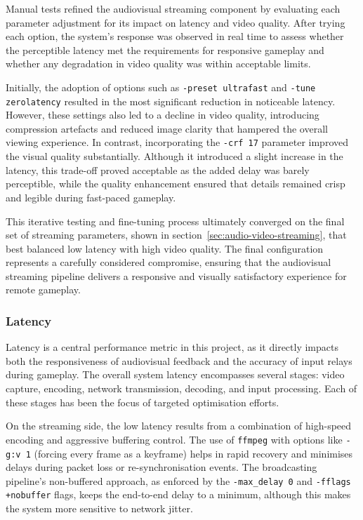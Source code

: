 Manual tests refined the audiovisual streaming component by evaluating each parameter adjustment for its impact on latency and video quality. After trying each option, the system’s response was observed in real time to assess whether the perceptible latency met the requirements for responsive gameplay and whether any degradation in video quality was within acceptable limits.

Initially, the adoption of options such as \texttt{-preset ultrafast} and \linebreak \texttt{-tune zerolatency} resulted in the most significant reduction in noticeable latency. However, these settings also led to a decline in video quality, introducing compression artefacts and reduced image clarity that hampered the overall viewing experience. In contrast, incorporating the \texttt{-crf 17} parameter improved the visual quality substantially. Although it introduced a slight increase in the latency, this trade-off proved acceptable as the added delay was barely perceptible, while the quality enhancement ensured that details remained crisp and legible during fast-paced gameplay.

This iterative testing and fine-tuning process ultimately converged on the final set of streaming parameters, shown in section~\ref{sec:audio-video-streaming}, that best balanced low latency with high video quality. The final configuration represents a carefully considered compromise, ensuring that the audiovisual streaming pipeline delivers a responsive and visually satisfactory experience for remote gameplay.


\subsubsection{Latency}

Latency is a central performance metric in this project, as it directly impacts
both the responsiveness of audiovisual feedback and the accuracy of input relays
during gameplay. The overall system latency encompasses several stages: video
capture, encoding, network transmission, decoding, and input processing. Each of
these stages has been the focus of targeted optimisation efforts.

On the streaming side, the low latency results from a combination of
high-speed encoding and aggressive buffering control. The use of \texttt{ffmpeg}
with options like \texttt{-g:v 1} (forcing every frame as a keyframe) helps in
rapid recovery and minimises delays during packet loss or re-synchronisation
events. The broadcasting pipeline’s non-buffered approach, as enforced by the
\texttt{-max\_delay 0} and \texttt{-fflags +nobuffer} flags, keeps the
end-to-end delay to a minimum, although this makes the system more
sensitive to network jitter.

